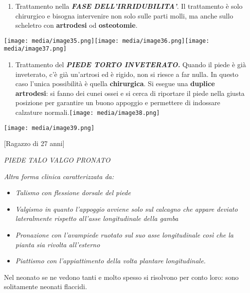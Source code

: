 \documentclass[]{article}
\begin{document}
\begin{enumerate}
\def\labelenumi{\arabic{enumi}.}
\item
  Trattamento nella \textbf{\emph{FASE DELL'IRRIDUBILITA'}}. Il
  trattamento è solo chirurgico e bisogna intervenire non solo sulle
  parti molli, ma anche sullo scheletro con \textbf{artrodesi} od
  \textbf{osteotomie}.
\end{enumerate}

\texttt{[image: media/image35.png]}\texttt{[image: media/image36.png]}\texttt{[image: media/image37.png]}

\begin{enumerate}
\def\labelenumi{\arabic{enumi}.}
\item
  Trattamento del \textbf{\emph{PIEDE TORTO INVETERATO.}} Quando il
  piede è già inveterato, c'è già un'artrosi ed è rigido, non si riesce
  a far nulla. In questo caso l'unica possibilità è quella
  \textbf{chirurgica}. Si esegue una \textbf{duplice artrodesi}: si
  fanno dei cunei ossei e si cerca di riportare il piede nella giusta
  posizione per garantire un buono appoggio e permettere di indossare
  calzature
  normali.\texttt{[image: media/image38.png]}
\end{enumerate}

\texttt{[image: media/image39.png]}

{[}Ragazzo di 27 anni{]}

\emph{PIEDE TALO VALGO PRONATO}

\emph{Altra forma clinica caratterizzata da:}

\begin{itemize}
\item
  \emph{Talismo con flessione dorsale del piede}
\item
  \emph{Valgismo in quanto l'appoggio avviene solo sul calcagno che
  appare deviato lateralmente rispetto all'asse longitudinale della
  gamba}
\item
  \emph{Pronazione con l'avampiede ruotato sul suo asse longitudinale
  così che la pianta sia rivolta all'esterno }
\item
  \emph{Piattismo con l'appiattimento della volta plantare
  longitudinale.}
\end{itemize}

Nel neonato se ne vedono tanti e molto spesso si risolvono per conto
loro: sono solitamente neonati flaccidi.
\end{document}
